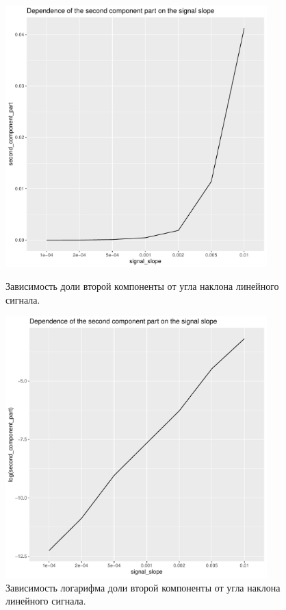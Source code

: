 \documentclass[specialist, substylefile = spbureport.rtx,
    subf,href,colorlinks=true, 12pt]{disser}
\begin{document}
        
        \begin{figure}[h]
            \centering
            \begin{minipage}{.5\textwidth}
                \centering
                \includegraphics[width=0.9\textwidth]{experiment_3_secondpart1.pdf}
                \caption{Зависимость доли второй компоненты от угла наклона линейного сигнала.}
                \label{fig:exp3_secondpart1}
            \end{minipage}%
            \begin{minipage}{.5\textwidth}
                \centering
            \includegraphics[width=0.9\textwidth]{experiment_3_secondpart2.pdf}
            \caption{Зависимость логарифма доли второй компоненты от угла наклона линейного сигнала.}
            \label{fig:exp3_secondpart2}
            \end{minipage}
        \end{figure}
\end{document}
